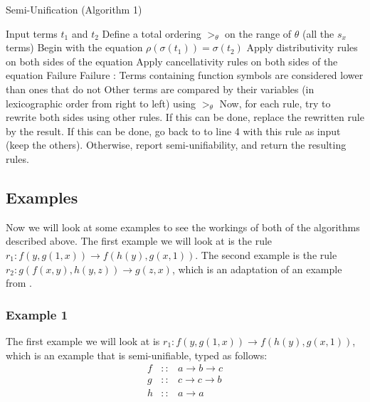 \begin{algorithm}
\caption{Semi-Unification (Algorithm 1)}
\label{semiunification1}
\begin{algorithmic}[1]
\STATE Input terms $t_1$ and $t_2$
\STATE Define a total ordering $>_\theta$ on the range of $\theta$ (all the $s_x$ terms)
\STATE Begin with the equation $\rho(\sigma(t_1)) = \sigma(t_2)$
\STATE Apply distributivity rules on both sides of the equation
\STATE Apply cancellativity rules on both sides of the equation
    \RETURN Failure
    \RETURN Failure
  \ENDIF
\ENDFOR
\STATE {}:
\STATE Terms containing function symbols are considered lower than ones that do not
\STATE Other terms are compared by their variables (in lexicographic order from right to left) using $>_\theta$
\STATE Now, for each rule, try to rewrite both sides using other rules. If this can be done, replace the rewritten rule by the result.
\STATE If this can be done, go back to to line 4 with this rule as input (keep the others). 
\STATE Otherwise, report semi-unifiability, and return the resulting rules. 
\end{algorithmic}
\end{algorithm}

\subsection{Examples} %
Now we will look at some examples to see the workings of both of the algorithms described above. The first example we will look at is the rule $r_1 : f(y, g(1, x)) \rightarrow f(h(y), g(x, 1))$. The second example is the rule $r_2 : g(f(x, y), h(y, z)) \rightarrow g(z, x)$, which is an adaptation of an example from \cite{SemiUnification}. 
\subsubsection*{Example 1}
The first example we will look at is $r_1 : f(y, g(1, x)) \rightarrow f(h(y), g(x, 1))$, which is an example that is semi-unifiable, typed as follows: 
$$
\begin{array}{rcl}
    f & :: & a \rightarrow b \rightarrow c \\
    g & :: & c \rightarrow c \rightarrow b \\
    h & :: & a \rightarrow a 
\end{array}
$$

